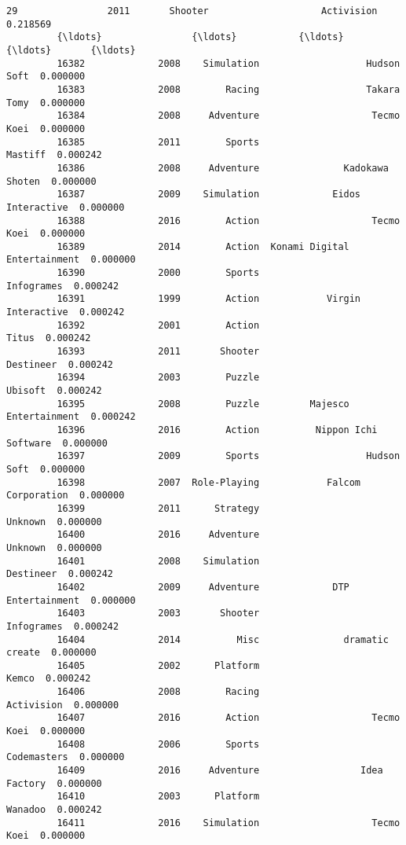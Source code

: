 \documentclass[11pt]{article}
\begin{document}
\begin{Verbatim}[commandchars=\\\{\}]
         29                2011       Shooter                    Activision  0.218569   
         {\ldots}                {\ldots}           {\ldots}                           {\ldots}       {\ldots}   
         16382             2008    Simulation                   Hudson Soft  0.000000   
         16383             2008        Racing                   Takara Tomy  0.000000   
         16384             2008     Adventure                    Tecmo Koei  0.000000   
         16385             2011        Sports                       Mastiff  0.000242   
         16386             2008     Adventure               Kadokawa Shoten  0.000000   
         16387             2009    Simulation             Eidos Interactive  0.000000   
         16388             2016        Action                    Tecmo Koei  0.000000   
         16389             2014        Action  Konami Digital Entertainment  0.000000   
         16390             2000        Sports                    Infogrames  0.000242   
         16391             1999        Action            Virgin Interactive  0.000242   
         16392             2001        Action                         Titus  0.000242   
         16393             2011       Shooter                     Destineer  0.000242   
         16394             2003        Puzzle                       Ubisoft  0.000242   
         16395             2008        Puzzle         Majesco Entertainment  0.000242   
         16396             2016        Action          Nippon Ichi Software  0.000000   
         16397             2009        Sports                   Hudson Soft  0.000000   
         16398             2007  Role-Playing            Falcom Corporation  0.000000   
         16399             2011      Strategy                       Unknown  0.000000   
         16400             2016     Adventure                       Unknown  0.000000   
         16401             2008    Simulation                     Destineer  0.000242   
         16402             2009     Adventure             DTP Entertainment  0.000000   
         16403             2003       Shooter                    Infogrames  0.000242   
         16404             2014          Misc               dramatic create  0.000000   
         16405             2002      Platform                         Kemco  0.000242   
         16406             2008        Racing                    Activision  0.000000   
         16407             2016        Action                    Tecmo Koei  0.000000   
         16408             2006        Sports                   Codemasters  0.000000   
         16409             2016     Adventure                  Idea Factory  0.000000   
         16410             2003      Platform                       Wanadoo  0.000242   
         16411             2016    Simulation                    Tecmo Koei  0.000000   
         

\end{Verbatim}
\end{document}
